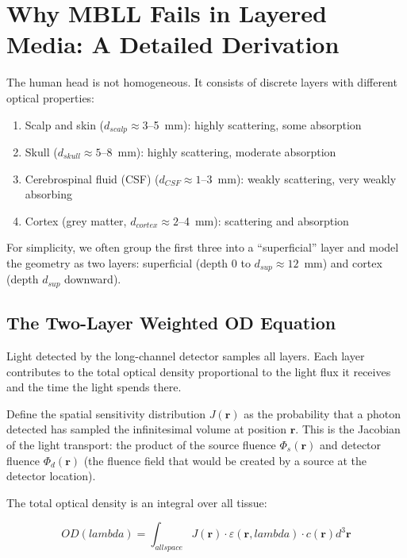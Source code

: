 \documentclass[12pt]{article}
\def\lambda{lambda}%
\def\text#1{#1}%
\def\,{ }%
\begin{document}
\section{Why MBLL Fails in Layered Media: A Detailed Derivation}

The human head is not homogeneous. It consists of discrete layers with different optical properties:

\begin{enumerate}
\item Scalp and skin ($d_{\text{scalp}} \approx 3$--5~mm): highly scattering, some absorption
\item Skull ($d_{\text{skull}} \approx 5$--8~mm): highly scattering, moderate absorption
\item Cerebrospinal fluid (CSF) ($d_{\text{CSF}} \approx 1$--3~mm): weakly scattering, very weakly absorbing
\item Cortex (grey matter, $d_{\text{cortex}} \approx 2$--4~mm): scattering and absorption
\end{enumerate}

For simplicity, we often group the first three into a ``superficial'' layer and model the geometry as two layers: superficial (depth 0 to $d_{\text{sup}} \approx 12$~mm) and cortex (depth $d_{\text{sup}}$ downward).

\subsection{The Two-Layer Weighted OD Equation}

Light detected by the long-channel detector samples all layers. Each layer contributes to the total optical density proportional to the light flux it receives and the time the light spends there.

Define the spatial sensitivity distribution $J(\mathbf{r})$ as the probability that a photon detected has sampled the infinitesimal volume at position $\mathbf{r}$. This is the Jacobian of the light transport: the product of the source fluence $\Phi_s(\mathbf{r})$ and detector fluence $\Phi_d(\mathbf{r})$ (the fluence field that would be created by a source at the detector location).

The total optical density is an integral over all tissue:

\begin{equation}
\text{OD}(\lambda) = \int_{\text{all space}} J(\mathbf{r}) \cdot \varepsilon(\mathbf{r}, \lambda) \cdot c(\mathbf{r}) \, d^3\mathbf{r}
\end{equation}
\end{document}
